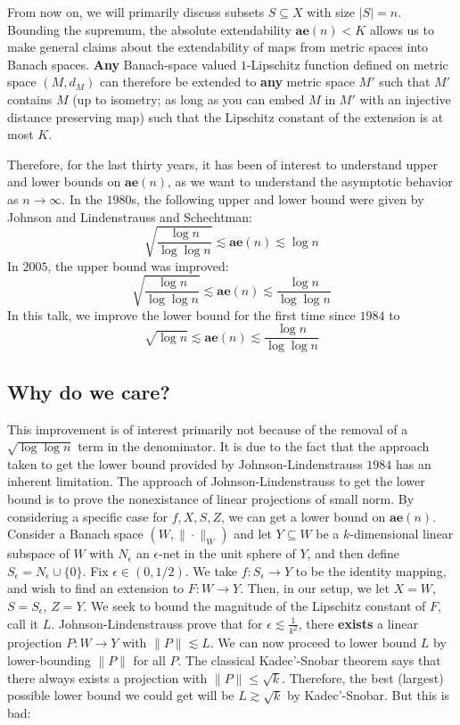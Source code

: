 From now on, we will primarily discuss subsets $S \subseteq X$ with size $|S| = n$. 
Bounding the supremum, the absolute extendability $\textbf{ae}(n) < K$ allows us to make general claims about the extendability of maps from metric spaces into Banach spaces. \textbf{Any} Banach-space valued $1$-Lipschitz function defined on metric space $(M, d_M)$ can therefore be extended to \textbf{any} metric space $M'$ such that $M'$ contains $M$ (up to isometry; as long as you can embed $M$ in $M'$ with an injective distance preserving map) such that the Lipschitz constant of the extension is at most $K$. 

Therefore, for the last thirty years, it has been of interest to understand upper and lower bounds on $\textbf{ae}(n)$, as we want to understand the asymptotic behavior as $n \to \infty$. In the $1980$s, the following upper and lower bound were given by Johnson and Lindenstrauss and Schechtman:
\[
\sqrt{\frac{\log n}{\log \log n}} \lesssim \textbf{ae}(n) \lesssim \log n
\]
In $2005$, the upper bound was improved:
\[
\sqrt{\frac{\log n}{\log \log n}} \lesssim \textbf{ae}(n) \lesssim \frac{\log n}{\log \log n}
\]
In this talk, we improve the lower bound for the first time since $1984$ to
\[
\sqrt{\log n} \lesssim \textbf{ae}(n) \lesssim \frac{\log n}{\log \log n}
\]

\subsection{Why do we care?}

This improvement is of interest primarily not because of the removal of a $\sqrt{\log \log n}$ term in the denominator.
It is due to the fact that the approach taken to get the lower bound provided by Johnson-Lindenstrauss $1984$ has an inherent limitation. 
The approach of Johnson-Lindenstrauss to get the lower bound is to prove the nonexistance of linear projections of small norm. 
By considering a specific case for $f, X, S, Z$, we can get a lower bound on $\textbf{ae}(n)$.
Consider a Banach space $(W, \|\cdot\|_W)$ and let $Y \subseteq W$ be a $k$-dimensional linear subspace of $W$ with $N_{\epsilon}$ an $\epsilon$-net in the unit sphere of $Y$, and then define $S_{\epsilon} = N_{\epsilon} \cup \{0\}$. Fix $\epsilon \in (0, 1/2)$. 
We take $f: S_{\epsilon} \to Y$ to be the identity mapping, and wish to find an extension to $F:W \to Y$. Then, in our setup, we let $X = W$, $S = S_{\epsilon}$, $Z = Y$. We seek to bound the magnitude of the Lipschitz constant of $F$, call it $L$. Johnson-Lindenstrauss prove that for $\epsilon \lesssim \frac{1}{k^2}$, there \textbf{exists} a linear projection $P:W \to Y$ with $\|P\| \lesssim L$. We can now proceed to lower bound $L$ by lower-bounding $\|P\|$ for all $P$. The classical Kadec'-Snobar theorem says that there always exists a projection with $\|P\| \leq \sqrt{k}$. Therefore, the best (largest) possible lower bound we could get will be $L \gtrsim \sqrt{k}$ by Kadec'-Snobar. But this is bad:

